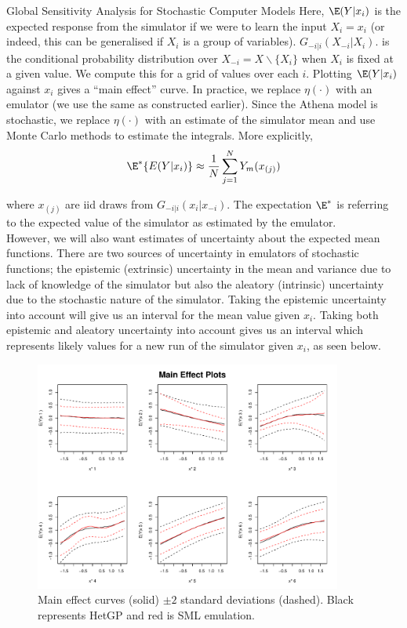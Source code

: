 \begin{chapter}{Global Sensitivity Analysis for Stochastic Computer Models}
Here, $\E(Y | x_i)$ is the expected response from the simulator if we were to learn the input $X_i = x_i$ (or indeed, this can be generalised if $X_i$ is a group of variables). $G_{-i|i}(X_{-i} | X_i)$. is the conditional probability distribution over $X_{-i} = X \backslash \{X_i\}$ when $X_i$ is fixed at a given value. We compute this for a grid of values over each $i$. Plotting $\E(Y | x_i)$ against $x_i$ gives a ``main effect'' curve. In practice, we replace $\eta(\cdot)$ with an emulator (we use the same as constructed earlier). Since the Athena model is stochastic, we replace $\eta(\cdot)$ with an estimate of the simulator mean and use Monte Carlo methods to estimate the integrals. More explicitly, 
\begin{equation}
	\E^* \{ E(Y|x_i)\} \approx \frac{1}{N}\sum_{j=1}^N Y_m(x_{(j)})
\end{equation}

where $x_{(j)}$ are iid draws from $G_{-i|i}(x_i | x_{-i})$. The expectation $\E^*$ is referring to the expected value of the simulator as estimated by the emulator.
\\

However, we will also want estimates of uncertainty about the expected mean functions. There are two sources of uncertainty in emulators of stochastic functions; the epistemic (extrinsic) uncertainty in the mean and variance due to lack of knowledge of the simulator but also the aleatory (intrinsic) uncertainty due to the stochastic nature of the simulator. Taking the epistemic uncertainty into account will give us an interval for the mean value given $x_i$. Taking both epistemic and aleatory uncertainty into account gives us an interval which represents likely values for a new run of the simulator given $x_i$, as seen below.\\

\begin{figure}
	\centering
	\includegraphics[width = 0.9\textwidth]{fig-sa/main-effects.pdf}
	\caption{Main effect curves (solid) $\pm 2$ standard deviations (dashed). Black represents HetGP and red is SML emulation.}
	\label{Fig:main-effect}
\end{figure}


\end{chapter}
